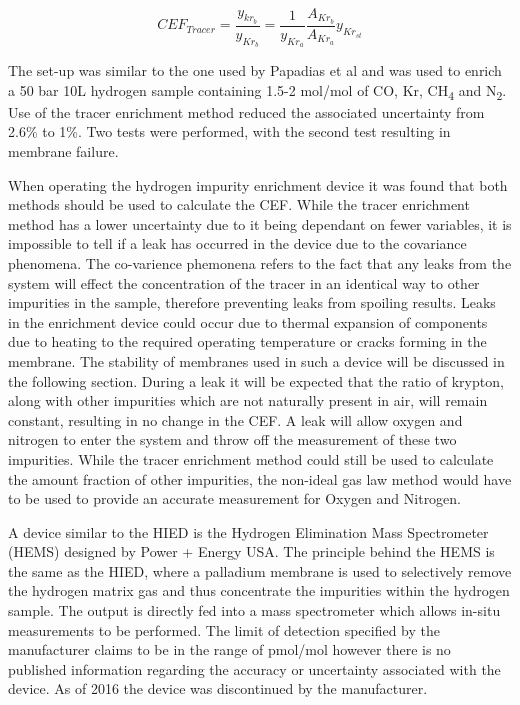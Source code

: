 \begin{equation} \label{eq:3}
    CEF_{Tracer} = \frac{y_{kr_b}}{y_{Kr_b}} = \frac{1}{y_{Kr_a}} \frac{A_{Kr_b}}{A_{Kr_a}} y_{Kr_{st}}
\end{equation}

The set-up was similar to the one used by Papadias et al \cite{Ahmed2010} and was used to enrich a 50 bar 10L hydrogen sample 
containing 1.5-2 \textmu mol/mol of CO, Kr, CH\textsubscript{4} and N\textsubscript{2}. Use of the tracer enrichment 
method reduced the associated uncertainty from 2.6\% to 1\%. 
Two tests were performed, with the second test resulting in membrane failure. 

When operating the hydrogen impurity enrichment device it was found that both methods should be used to 
calculate the CEF.\cite{Murugan2014, Murugan2015} While the tracer enrichment method has a lower uncertainty 
due to it being dependant on fewer variables, it is impossible to tell if a leak has occurred in the device 
due to the covariance 
phenomena. \cite{Murugan2014} The co-varience phemonena refers to the fact that any leaks from the system will effect the concentration of the tracer in an identical way to other impurities in the sample, therefore preventing leaks from spoiling results. Leaks in the enrichment device could occur due to thermal expansion of components due to heating 
to the required operating temperature or cracks forming in the membrane. The stability of membranes used in 
such a device will be discussed in the following section. During a leak it will be expected that the ratio of 
krypton, along with other impurities which are not naturally present in air, will remain constant, resulting 
in no change in the CEF. A leak will allow oxygen and nitrogen to enter the system and throw off the 
measurement of these two impurities. While the tracer enrichment method could still be used to calculate 
the amount fraction of other impurities, the non-ideal gas law method would have to be used to provide an 
accurate measurement for Oxygen and Nitrogen.

A device similar to the HIED is the Hydrogen Elimination Mass Spectrometer (HEMS) designed by Power + Energy USA. \cite{Bossard} 
The principle behind the HEMS is the same as the HIED, where a palladium membrane is used to selectively 
remove the hydrogen matrix gas and thus concentrate the impurities within the hydrogen sample. 
The output is directly fed into a mass spectrometer which allows in-situ measurements to be performed. 
The limit of detection specified by the manufacturer claims to be in the range of pmol/mol however there is 
no published information regarding the accuracy or uncertainty associated with the device. 
As of 2016 the device was discontinued by the manufacturer.


